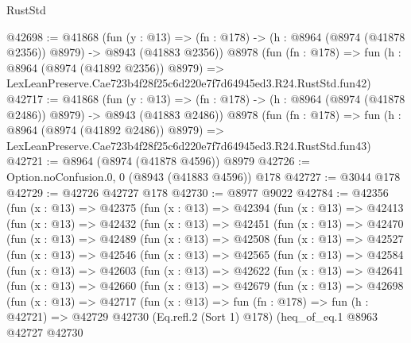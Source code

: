 \begin{lexlean}{RustStd}
\begin{coremodule}
@42698 := @41868
    (fun (y : @13) =>
    (fn : @178) -> (h : @8964 (@8974 (@41878 @2356)) @8979) -> @8943 (@41883 @2356))
    @8978
    (fun (fn : @178) =>
    fun (h : @8964 (@8974 (@41892 @2356)) @8979) =>
    LexLeanPreserve.Cae723b4f28f25c6d220e7f7d64945ed3.R24.RustStd.fun42)
@42717 := @41868
    (fun (y : @13) =>
    (fn : @178) -> (h : @8964 (@8974 (@41878 @2486)) @8979) -> @8943 (@41883 @2486))
    @8978
    (fun (fn : @178) =>
    fun (h : @8964 (@8974 (@41892 @2486)) @8979) =>
    LexLeanPreserve.Cae723b4f28f25c6d220e7f7d64945ed3.R24.RustStd.fun43)
@42721 := @8964 (@8974 (@41878 @4596)) @8979
@42726 := Option.noConfusion.{0, 0} (@8943 (@41883 @4596)) @178
@42727 := @3044 @178
@42729 := @42726 @42727 @178
@42730 := @8977 @9022
@42784 := @42356
    (fun (x : @13) =>
    @42375
      (fun (x : @13) =>
      @42394
        (fun (x : @13) =>
        @42413
          (fun (x : @13) =>
          @42432
            (fun (x : @13) =>
            @42451
              (fun (x : @13) =>
              @42470
                (fun (x : @13) =>
                @42489
                  (fun (x : @13) =>
                  @42508
                    (fun (x : @13) =>
                    @42527
                      (fun (x : @13) =>
                      @42546
                        (fun (x : @13) =>
                        @42565
                          (fun (x : @13) =>
                          @42584
                            (fun (x : @13) =>
                            @42603
                              (fun (x : @13) =>
                              @42622
                                (fun (x : @13) =>
                                @42641
                                  (fun (x : @13) =>
                                  @42660
                                    (fun (x : @13) =>
                                    @42679
                                      (fun (x : @13) =>
                                      @42698
                                        (fun (x : @13) =>
                                        @42717
                                          (fun (x : @13) =>
                                          fun (fn : @178) =>
                                          fun (h : @42721) =>
                                          @42729
                                            @42730
                                            (Eq.refl.{2} (Sort 1) @178)
                                            (heq_of_eq.{1}
                                              @8963
                                              @42727
                                              @42730

\end{coremodule}
\end{lexlean}
